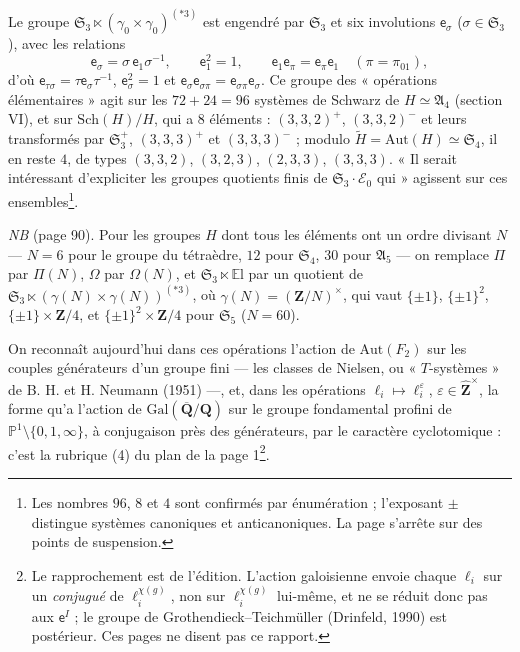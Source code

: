 \documentclass[11pt,a4paper]{article}
\begin{document}
Le groupe $\mathfrak{S}_3 \ltimes (\gamma_0 \times \gamma_0)^{(*3)}$ est engendré
par $\mathfrak{S}_3$ et six involutions $\mathsf{e}_\sigma$ ($\sigma \in
\mathfrak{S}_3$), avec les relations
\[
  \mathsf{e}_\sigma = \sigma\, \mathsf{e}_1 \sigma^{-1}, \qquad \mathsf{e}_1^2 = 1,
  \qquad \mathsf{e}_1 \mathsf{e}_\pi = \mathsf{e}_\pi \mathsf{e}_1 \quad (\pi =
  \pi_{01}) ,
\]
d'où $\mathsf{e}_{\tau\sigma} = \tau\mathsf{e}_\sigma\tau^{-1}$, $\mathsf{e}_\sigma^2
= 1$ et $\mathsf{e}_\sigma\mathsf{e}_{\sigma\pi} = \mathsf{e}_{\sigma\pi}
\mathsf{e}_\sigma$. Ce groupe des « opérations élémentaires » agit sur les
$72 + 24 = 96$ systèmes de Schwarz de $H \simeq \mathfrak{A}_4$ (section VI), et
sur $\mathrm{Sch}(H)/H$, qui a $8$ éléments : $(3,3,2)^+$, $(3,3,2)^-$ et leurs
transformés par $\mathfrak{S}_3^+$, $(3,3,3)^+$ et $(3,3,3)^-$ ; modulo
$\widetilde H = \mathrm{Aut}(H) \simeq \mathfrak{S}_4$, il en reste $4$, de types
$(3,3,2)$, $(3,2,3)$, $(2,3,3)$, $(3,3,3)$. « Il serait intéressant d'expliciter
les groupes quotients finis de $\mathfrak{S}_3 \cdot \mathcal{E}_0$ qui » agissent
sur ces ensembles\footnote{Les nombres $96$, $8$ et $4$ sont confirmés par
énumération ; l'exposant $\pm$ distingue systèmes canoniques et
anticanoniques. La page s'arrête sur des points de suspension.}.

\emph{NB} (page 90). Pour les groupes $H$ dont tous les éléments ont un ordre
divisant $N$ --- $N = 6$ pour le groupe du tétraèdre, $12$ pour
$\mathfrak{S}_4$, $30$ pour $\mathfrak{A}_5$ --- on remplace $\Pi$ par $\Pi(N)$,
$\Omega$ par $\Omega(N)$, et $\mathfrak{S}_3 \ltimes \mathbb{E}\mathrm{l}$ par un
quotient de $\mathfrak{S}_3 \ltimes (\gamma(N) \times \gamma(N))^{(*3)}$, où
$\gamma(N) = (\mathbf{Z}/N)^\times$, qui vaut $\{\pm1\}$, $\{\pm1\}^2$,
$\{\pm1\} \times \mathbf{Z}/4$, et $\{\pm 1\}^2 \times \mathbf{Z}/4$ pour
$\mathfrak{S}_5$ ($N = 60$).

On reconnaît aujourd'hui dans ces opérations l'action de $\mathrm{Aut}(F_2)$
sur les couples générateurs d'un groupe fini --- les classes de Nielsen, ou
« $T$-systèmes » de B. H. et H. Neumann (1951) ---, et, dans les opérations
$\ell_i \mapsto \ell_i^{\varepsilon}$, $\varepsilon \in \widehat{\mathbf{Z}}^\times$,
la forme qu'a l'action de $\mathrm{Gal}(\overline{\mathbf{Q}}/\mathbf{Q})$ sur le
groupe fondamental profini de $\mathbb{P}^1 \setminus \{0, 1, \infty\}$, à
conjugaison près des générateurs, par le caractère cyclotomique : c'est la
rubrique (4) du plan de la page 1\footnote{Le rapprochement est de l'édition.
L'action galoisienne envoie chaque $\ell_i$ sur un \emph{conjugué} de
$\ell_i^{\chi(g)}$, non sur $\ell_i^{\chi(g)}$ lui-même, et ne se réduit donc pas
aux $\mathsf{e}^I$ ; le groupe de Grothendieck--Teichmüller (Drinfeld, 1990)
est postérieur. Ces pages ne disent pas ce rapport.}.
\end{document}
